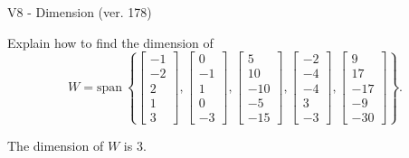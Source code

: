 \begin{exercise}
  \begin{exerciseTitle}V8 - Dimension (ver. 178)\end{exerciseTitle}
  \begin{exerciseStatement}
    Explain how to find the dimension of 
\[W=\mathrm{span}\ \left\{\left[\begin{array}{r}
-1 \\
-2 \\
2 \\
1 \\
3
\end{array}\right] , \left[\begin{array}{r}
0 \\
-1 \\
1 \\
0 \\
-3
\end{array}\right] , \left[\begin{array}{r}
5 \\
10 \\
-10 \\
-5 \\
-15
\end{array}\right] , \left[\begin{array}{r}
-2 \\
-4 \\
-4 \\
3 \\
-3
\end{array}\right] , \left[\begin{array}{r}
9 \\
17 \\
-17 \\
-9 \\
-30
\end{array}\right]\right\}.\]



  \end{exerciseStatement}
  \begin{exerciseAnswer}
   The dimension of \(W\) is  \(3\).
  


  \end{exerciseAnswer}
\end{exercise}